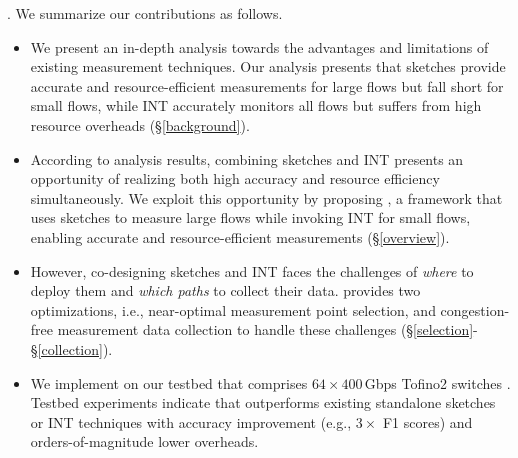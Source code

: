 

. 
We summarize our contributions as follows.  

\begin{itemize}[leftmargin=*]
%
    \item We present an in-depth analysis towards the advantages and limitations of existing measurement techniques. Our analysis presents that sketches provide accurate and resource-efficient measurements for large flows but fall short for small flows, while INT accurately monitors all flows but suffers from high resource overheads (\S\ref{background}). 
%
    \item According to analysis results, combining sketches and INT presents an opportunity of realizing both high accuracy and resource efficiency simultaneously. We exploit this opportunity by proposing \sysname, a framework that uses sketches to measure large flows while invoking INT for small flows, enabling accurate and resource-efficient measurements (\S\ref{overview}). 
%
    \item However, co-designing sketches and INT faces the challenges of \emph{where} to deploy them and \emph{which paths} to collect their data. \sysname provides two optimizations, i.e., near-optimal measurement point selection, and congestion-free measurement data collection to handle these challenges (\S\ref{selection}-\S\ref{collection}). 
%
    \item We implement \sysname on our testbed that comprises $64\times 400$\,Gbps Tofino2 switches \cite{tofino2}. Testbed experiments indicate that \sysname outperforms existing standalone sketches or INT techniques with accuracy improvement (e.g., $3\times$ F1 scores) and orders-of-magnitude lower overheads. 
%
\end{itemize}

